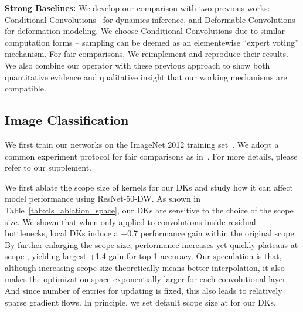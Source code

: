 \documentclass{article} \usepackage{iclr2020_conference, times}
\newcommand{\bfsection}[1]{\noindent\textbf{#1:}}
\begin{document}
\bfsection{Strong Baselines}
We develop our comparison with two previous works: Conditional
Convolutions~\citep{yang2019soft} for dynamics inference, and Deformable
Convolutions~\citep{dai2017deformable,zhu2019deformable} for deformation
modeling.
We choose Conditional Convolutions due to similar computation forms --
sampling can be deemed as an elementewise ``expert voting'' mechanism.
For fair comparisons, We reimplement and reproduce their results.
We also combine our operator with these previous approach to show
both quantitative evidence and qualitative insight that our working mechanisms
are compatible.

\subsection{Image Classification} \label{sec:cls}

We first train our networks on the ImageNet 2012 training
set~\citep{deng2009imagenet}.
We adopt a common experiment protocol for fair comparisons as in~\citet{goyal2017accurate,loshchilov2016sgdr}.
For more details, please refer to our supplement.

We first ablate the scope size of kernels for our DKs and study how it can
affect model performance using ResNet-50-DW.
As shown in Table~\ref{tab:cls_ablation_space}, our DKs are sensitive to the
choice of the scope size.
We shown that when only applied to  convolutions inside residual
bottlenecks, local DKs induce a +0.7 performance gain within the original
scope.
By further enlarging the scope size, performance increases yet quickly plateaus
at scope , yielding largest +1.4 gain for top-1 accuracy.
Our speculation is that, although increasing scope size theoretically means
better interpolation, it also makes the optimization space exponentially larger
for each convolutional layer.
And since number of entries for updating is fixed, this also leads to
relatively sparse gradient flows.
In principle, we set default scope size at  for our DKs.
\end{document}
